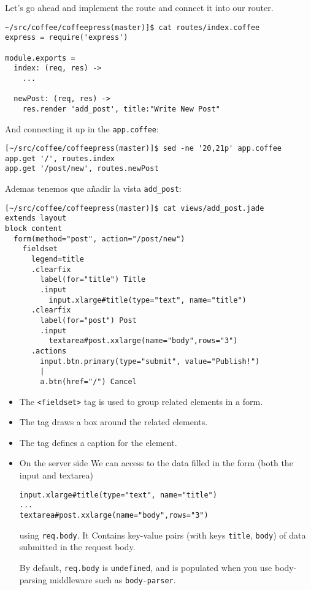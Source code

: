 
Let’s go ahead and implement the route and connect it into our router.
\begin{verbatim}
~/src/coffee/coffeepress(master)]$ cat routes/index.coffee 
express = require('express')

module.exports = 
  index: (req, res) ->
    ...

  newPost: (req, res) ->
    res.render 'add_post', title:"Write New Post"

\end{verbatim}
And connecting it up in the \verb|app.coffee|:
\begin{verbatim}
[~/src/coffee/coffeepress(master)]$ sed -ne '20,21p' app.coffee 
app.get '/', routes.index
app.get '/post/new', routes.newPost
\end{verbatim}


Ademas tenemos que añadir la vista  \verb|add_post|:
\begin{verbatim}
[~/src/coffee/coffeepress(master)]$ cat views/add_post.jade 
extends layout
block content
  form(method="post", action="/post/new")
    fieldset
      legend=title
      .clearfix
        label(for="title") Title
        .input
          input.xlarge#title(type="text", name="title")
      .clearfix
        label(for="post") Post
        .input
          textarea#post.xxlarge(name="body",rows="3")
      .actions
        input.btn.primary(type="submit", value="Publish!")
        |   
        a.btn(href="/") Cancel
\end{verbatim}

\begin{itemize}
\item
The \verb|<fieldset>| tag is used to group related elements in a form.
\item
The 
tag draws a box around the related elements.
\item
The 
tag defines a caption for the 
element.
\end{itemize}

\begin{itemize}
\item
On the server side We can access to the data filled in the form 
(both the input and textarea)
\begin{verbatim}
input.xlarge#title(type="text", name="title")
...
textarea#post.xxlarge(name="body",rows="3")
\end{verbatim}
using \verb|req.body|. It
Contains key-value pairs (with keys \verb|title|, \verb|body|)
of data submitted in the request body. 

By default, \verb|req.body| is \verb|undefined|, 
and is populated when you use body-parsing middleware such as 
\verb|body-parser|.
\end{itemize}

